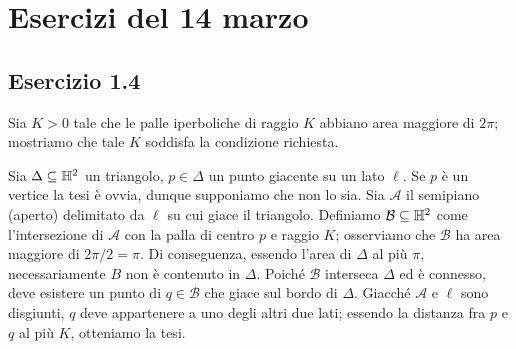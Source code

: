 \section*{Esercizi del 14 marzo}

\subsection*{Esercizio 1.4}
Sia $K>0$ tale che le palle iperboliche di raggio $K$ abbiano area maggiore di $2\pi$; mostriamo che tale $K$ soddisfa la condizione richiesta.

Sia $\Delta\subseteq\mathbb{H}^2$ un triangolo, $p\in\Delta$ un punto giacente su un lato $\ell$. Se $p$ è un vertice la tesi è ovvia, dunque supponiamo che non lo sia. Sia $\mathcal{A}$ il semipiano (aperto) delimitato da $\ell$ su cui giace il triangolo. Definiamo $\mathcal{B}\subseteq\mathbb{H}^2$ come l'intersezione di $\mathcal{A}$ con la palla di centro $p$ e raggio $K$; osserviamo che $\mathcal{B}$ ha area maggiore di $2\pi/2=\pi$. Di conseguenza, essendo l'area di $\Delta$ al più $\pi$, necessariamente $B$ non è contenuto in $\Delta$. Poiché $\mathcal{B}$ interseca $\Delta$ ed è connesso, deve esistere un punto di $q\in \mathcal{B}$ che giace sul bordo di $\Delta$. Giacché $\mathcal{A}$ e $\ell$ sono disgiunti, $q$ deve appartenere a uno degli altri due lati; essendo la distanza fra $p$ e $q$ al più $K$, otteniamo la tesi.
